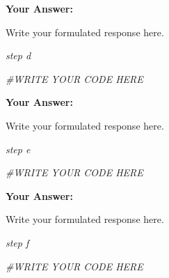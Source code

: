 \documentclass[
]{article}
\newenvironment{Shaded}{\begin{snugshade}}{\end{snugshade}}
\newcommand{\CommentTok}[1]{\textcolor[rgb]{0.56,0.35,0.01}{\textit{#1}}}
\begin{document}
\textbf{Your Answer:}

Write your formulated response here.

\emph{step d}

\begin{Shaded}
\begin{Highlighting}[]
\CommentTok{\#WRITE YOUR CODE HERE}
\end{Highlighting}
\end{Shaded}

\textbf{Your Answer:}

Write your formulated response here.

\emph{step e}

\begin{Shaded}
\begin{Highlighting}[]
\CommentTok{\#WRITE YOUR CODE HERE}
\end{Highlighting}
\end{Shaded}

\textbf{Your Answer:}

Write your formulated response here.

\emph{step f}

\begin{Shaded}
\begin{Highlighting}[]
\CommentTok{\#WRITE YOUR CODE HERE}
\end{Highlighting}
\end{Shaded}
\end{document}
